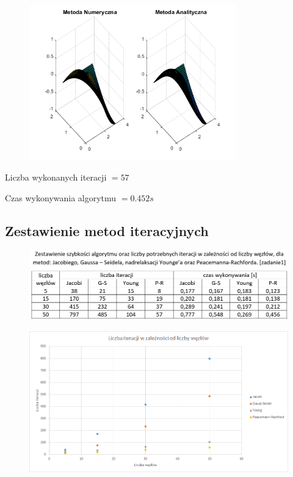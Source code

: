 \begin{figure}[!ht]
	\begin{center}
		\includegraphics[width=0.8\textwidth]{Lab6/charts/pr/zad2/50.png}
	\end{center}
\end{figure}

Liczba wykonanych iteracji $ = 57 $

Czas wykonywania algorytmu $ = 0.452 s$

\newpage

\subsection{Zestawienie metod iteracyjnych}
\begin{figure}[!ht]
	\begin{center}
		\includegraphics[width=1\textwidth]{Lab6/charts/zestawienie_zad1.png}
	\end{center}
\end{figure}

\begin{figure}[!ht]
	\begin{center}
		\includegraphics[width=1\textwidth]{Lab6/charts/zestawienie_wykres_zad1.png}
	\end{center}
\end{figure}

